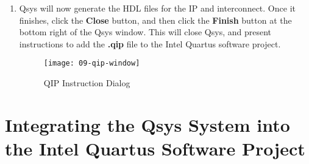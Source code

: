 \begin{flushleft}
\begin{enumerate}[
	label=\textbf{Step \arabic*.},
	leftmargin=*,
	widest={00},
	align=left]
\begin{figure}[H]
\centering
\texttt{[image: 08-generate]}
\caption{Qsys Generate Dialog}
\label{fig:08-generate}
\end{figure}

\item Qsys will now generate the HDL files for the IP and interconnect.  Once it finishes, click the \textbf{Close} button, and then click the \textbf{Finish} button at the bottom right of the Qsys window.  This will close Qsys, and present instructions to add the \textbf{.qip} file to the Intel Quartus software project.

\begin{figure}[H]
\centering
\texttt{[image: 09-qip-window]}
\caption{QIP Instruction Dialog}
\label{fig:09-qip-window}
\end{figure}

\end{enumerate}

\end{flushleft}

\newpage

\section*{Integrating the Qsys System into the Intel Quartus Software Project}

